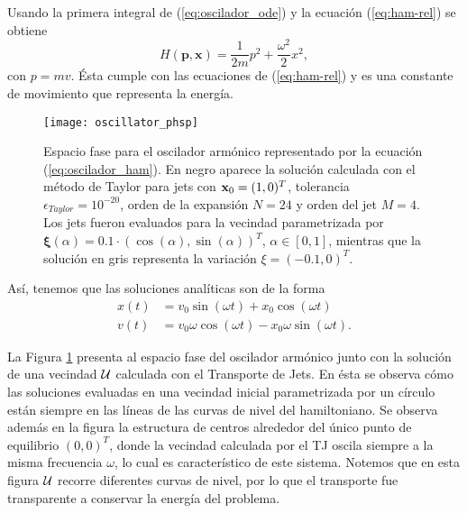 Usando la primera integral de (\ref{eq:oscilador_ode}) y la ecuación (\ref{eq:ham-rel}) se obtiene
\begin{equation}
 H(\mathbf{p},\mathbf{x}) = \frac{1}{2m}p^2 + \frac{\omega^2}{2} x^2,
 \label{eq:oscilador_ham}
\end{equation}
con $p=mv$. Ésta cumple con las ecuaciones de (\ref{eq:ham-rel}) y es una constante de movimiento que representa la energía.

\begin{figure}[h!]
 \centering
 \texttt{[image: oscillator\_phsp]}
 \caption{Espacio fase para el oscilador armónico representado por la ecuación (\ref{eq:oscilador_ham}). En negro aparece la solución calculada con el método de Taylor para jets con $\mathbf{x}_0 = (1,0)^T$, tolerancia $\epsilon_{Taylor} = 10^{-20}$, orden de la expansión $N = 24$ y orden del jet $M=4$. Los jets fueron evaluados para la vecindad parametrizada por $\mathbf{\xi}(\alpha) = 0.1\cdot \left( \cos(\alpha), \sin(\alpha) \right)^T$, $\alpha \in [0,1]$, mientras que la solución en gris representa la variación $\xi = (-0.1,0)^T$.}
 \label{fig:oscilador_phsp}
\end{figure}

Así, tenemos que las soluciones analíticas son de la forma 
\begin{align}
 x(t) &= v_{0}\sin{(\omega t)} + x_{0}\cos{(\omega t)} \nonumber \\ 
 v(t) &= v_{0}\omega\cos{(\omega t)} - x_{0}\omega\sin{(\omega t)}. 
 \label{eq:oscilador_analytical}
\end{align}

La Figura \ref{fig:oscilador_phsp} presenta al espacio fase del oscilador armónico junto con la solución de una vecindad $\mathcal{U}$ calculada con el Transporte de Jets. En ésta se observa cómo las soluciones evaluadas en una vecindad inicial parametrizada por un círculo están siempre en las líneas de las curvas de nivel del hamiltoniano. Se observa además en la figura la estructura de centros alrededor del único punto de equilibrio $(0,0)^T$, donde la vecindad calculada por el TJ oscila siempre a la misma frecuencia $\omega$, lo cual es característico de este sistema. Notemos que en esta figura $\mathcal{U}$ recorre diferentes curvas de nivel, por lo que el transporte fue transparente a conservar la energía del problema.

